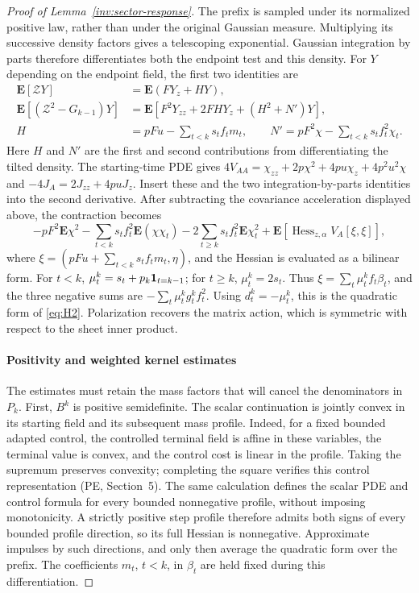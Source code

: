 \begin{proof}[Proof of Lemma~\ref{inv:sector-response}]
The prefix is sampled under its normalized positive law, rather than
under the original Gaussian measure. Multiplying its successive density
factors gives a telescoping exponential. Gaussian integration by parts
therefore differentiates both the endpoint test and this density. For
\(Y\) depending on the endpoint field, the first two identities are
\[
\begin{split}
 \mathbf E[\mathcal ZY]&=\mathbf E(FY_z+HY),\\
 \mathbf E[(\mathcal Z^2-G_{k-1})Y]&=\mathbf E[F^2Y_{zz}+2FHY_z+(H^2+N')Y],\\
 H&=pF u-\sum_{t<k}s_t f_t m_t,\qquad
 N'=pF^2\chi-\sum_{t<k}s_t f_t^2\chi_t .
\end{split}
\]
Here \(H\) and \(N'\) are the first and second contributions from
differentiating the tilted density. The starting-time PDE gives
\(4V_{AA}=\chi_{zz}+2p\chi^2+4p u\chi_z+4p^2u^2\chi\) and
\(-4J_A=2J_{zz}+4p uJ_z\). Insert these and the two integration-by-parts
identities into the second derivative. After subtracting the covariance
acceleration displayed above, the contraction becomes
\[
 -p F^2\mathbf E\chi^2-\sum_{t<k}s_t f_t^2\mathbf E(\chi\chi_t)
 -2\sum_{t\ge k}s_t f_t^2\mathbf E\chi_t^2
 +\mathbf E\left[\operatorname{Hess}_{z,\alpha}V_A[\xi,\xi]\right],
\]
where \(\xi=(pF u+\sum_{t<k}s_t f_t m_t,\eta)\), and the Hessian is
evaluated as a bilinear form. For \(t<k\),
\(\mu_t^k=s_t+p_k{\bf1}_{t=k-1}\); for \(t\ge k\),
\(\mu_t^k=2s_t\). Thus \(\xi=\sum_t\mu_t^k f_t\beta_t\), and the
three negative sums are \(-\sum_t\mu_t^k g_t^k f_t^2\).
Using \(d_t^k=-\mu_t^k\), this is the quadratic form of
\eqref{eq:H2}. Polarization recovers the matrix action, which is
symmetric with respect to the sheet inner product.

\paragraph{Positivity and weighted kernel estimates}\label{par:inverse-kernel-estimates}
The estimates must retain the mass factors that will cancel the
denominators in \(P_k\). First, \(B^k\) is positive semidefinite. The
scalar continuation is jointly convex in its starting field and its
subsequent mass profile. Indeed, for a fixed bounded adapted control,
the controlled terminal field is affine in these variables, the
terminal value is convex, and the control cost is linear in the profile.
Taking the supremum preserves convexity; completing the square verifies
this control representation (PE, Section~5). The same calculation defines
the scalar PDE and control formula for every bounded nonnegative
profile, without imposing monotonicity. A strictly positive step profile
therefore admits both signs of every bounded profile direction, so its
full Hessian is nonnegative.
Approximate impulses by such directions, and only then average the
quadratic form over the prefix. The coefficients \(m_t\), \(t<k\),
in \(\beta_t\) are held fixed during this differentiation.


\end{proof}
